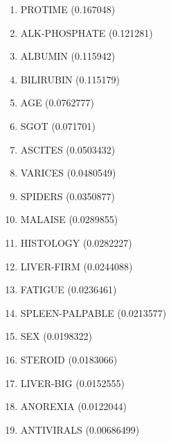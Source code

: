 \begin{enumerate}
\item PROTIME (0.167048)
\item ALK-PHOSPHATE (0.121281)
\item ALBUMIN (0.115942)
\item BILIRUBIN (0.115179)
\item AGE (0.0762777)
\item SGOT (0.071701)
\item ASCITES (0.0503432)
\item VARICES (0.0480549)
\item SPIDERS (0.0350877)
\item MALAISE (0.0289855)
\item HISTOLOGY (0.0282227)
\item LIVER-FIRM (0.0244088)
\item FATIGUE (0.0236461)
\item SPLEEN-PALPABLE (0.0213577)
\item SEX (0.0198322)
\item STEROID (0.0183066)
\item LIVER-BIG (0.0152555)
\item ANOREXIA (0.0122044)
\item ANTIVIRALS (0.00686499)
\end{enumerate}